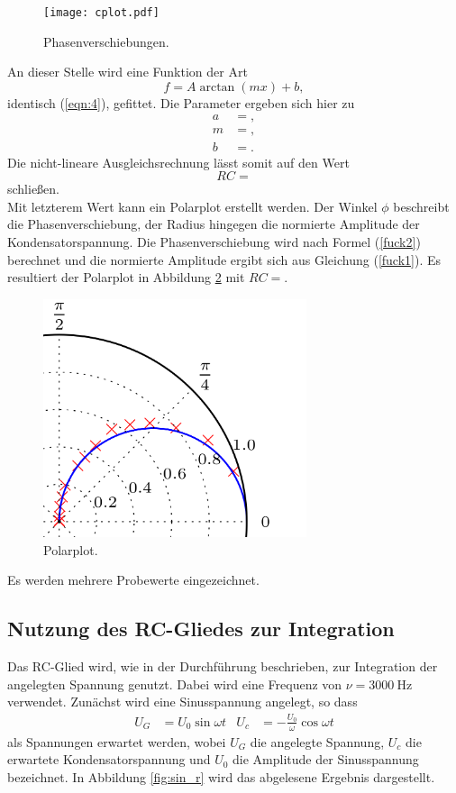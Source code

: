\begin{figure}[H]
  \centering
  \texttt{[image: cplot.pdf]}
  \caption{Phasenverschiebungen.}
  \label{abb:4}
\end{figure}

An dieser Stelle wird eine Funktion der Art
\begin{equation}
  f = A\arctan(mx)+b,
\end{equation}
identisch (\ref{eqn:4}), gefittet.
Die Parameter ergeben sich hier zu
\begin{align*}
  a &= , \\
  m &= ,  \\
  b &= .
\end{align*}
Die nicht-lineare Ausgleichsrechnung lässt somit auf den Wert
\begin{equation}
  RC = 
\end{equation}
schließen.\\
Mit letzterem Wert kann ein Polarplot erstellt werden.
Der Winkel $\phi$ beschreibt die Phasenverschiebung, der Radius hingegen die normierte Amplitude der Kondensatorspannung.
Die Phasenverschiebung wird nach Formel (\ref{fuck2}) berechnet und die normierte Amplitude ergibt sich aus Gleichung (\ref{fuck1}).
Es resultiert der Polarplot in Abbildung \ref{abb:5} mit $RC = $.

\begin{figure}[H]
  \centering
  \includegraphics[height=7cm]{fake_plot.png}
  \caption{Polarplot.}
  \label{abb:5}
\end{figure}

Es werden mehrere Probewerte eingezeichnet.

\subsection{Nutzung des RC-Gliedes zur Integration}
Das RC-Glied wird, wie in der Durchführung beschrieben, zur Integration der angelegten Spannung genutzt.
Dabei wird eine Frequenz von $\nu = \SI{3000}{\hertz}$ verwendet.
Zunächst wird eine Sinusspannung angelegt, so dass
\begin{align}
U_G &= U_0\sin{\omega t}  & U_c &= -\frac{U_0}{\omega}\cos{\omega t}
\end{align}
als Spannungen erwartet werden, wobei $U_G$ die angelegte Spannung, $U_c$ die erwartete Kondensatorspannung und $U_0$ die Amplitude der Sinusspannung bezeichnet.
In Abbildung \ref{fig:sin_r} wird das abgelesene Ergebnis dargestellt.

